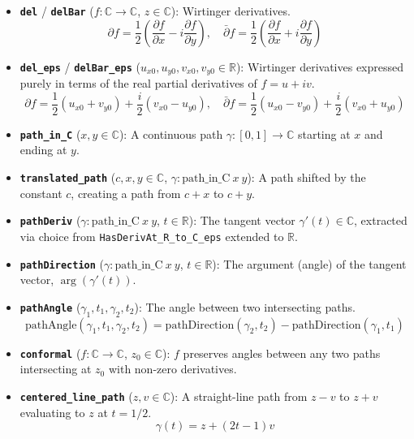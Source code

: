 \documentclass[11pt]{article}
\begin{document}
\begin{itemize}
    \item \textbf{\texttt{del}} / \textbf{\texttt{delBar}} ($f : \mathbb{C} \to \mathbb{C}$, $z \in \mathbb{C}$): Wirtinger derivatives.
    \[ \partial f = \frac{1}{2} \left( \frac{\partial f}{\partial x} - i \frac{\partial f}{\partial y} \right), \quad \bar{\partial} f = \frac{1}{2} \left( \frac{\partial f}{\partial x} + i \frac{\partial f}{\partial y} \right) \]
    
    \item \textbf{\texttt{del\_eps}} / \textbf{\texttt{delBar\_eps}} ($u_{x0}, u_{y0}, v_{x0}, v_{y0} \in \mathbb{R}$): Wirtinger derivatives expressed purely in terms of the real partial derivatives of $f = u + iv$.
    \[ \partial f = \frac{1}{2} (u_{x0} + v_{y0}) + \frac{i}{2} (v_{x0} - u_{y0}), \quad \bar{\partial} f = \frac{1}{2} (u_{x0} - v_{y0}) + \frac{i}{2} (v_{x0} + u_{y0}) \]
    
    \item \textbf{\texttt{path\_in\_C}} ($x, y \in \mathbb{C}$): A continuous path $\gamma : [0, 1] \to \mathbb{C}$ starting at $x$ and ending at $y$.
    
    \item \textbf{\texttt{translated\_path}} ($c, x, y \in \mathbb{C}$, $\gamma : \text{path\_in\_C}\ x\ y$): A path shifted by the constant $c$, creating a path from $c+x$ to $c+y$.
    
    \item \textbf{\texttt{pathDeriv}} ($\gamma : \text{path\_in\_C}\ x\ y$, $t \in \mathbb{R}$): The tangent vector $\gamma'(t) \in \mathbb{C}$, extracted via choice from \texttt{HasDerivAt\_R\_to\_C\_eps} extended to $\mathbb{R}$.
    
    \item \textbf{\texttt{pathDirection}} ($\gamma : \text{path\_in\_C}\ x\ y$, $t \in \mathbb{R}$): The argument (angle) of the tangent vector, $\arg(\gamma'(t))$.
    
    \item \textbf{\texttt{pathAngle}} ($\gamma_1, t_1, \gamma_2, t_2$): The angle between two intersecting paths.
    \[ \text{pathAngle}(\gamma_1, t_1, \gamma_2, t_2) = \text{pathDirection}(\gamma_2, t_2) - \text{pathDirection}(\gamma_1, t_1) \]
    
    \item \textbf{\texttt{conformal}} ($f : \mathbb{C} \to \mathbb{C}$, $z_0 \in \mathbb{C}$): $f$ preserves angles between any two paths intersecting at $z_0$ with non-zero derivatives.
    
    \item \textbf{\texttt{centered\_line\_path}} ($z, v \in \mathbb{C}$): A straight-line path from $z - v$ to $z + v$ evaluating to $z$ at $t = 1/2$.
    \[ \gamma(t) = z + (2t - 1)v \]
\end{itemize}
\end{document}
